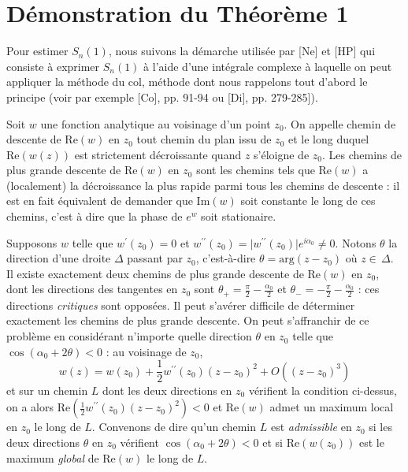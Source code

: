 \documentclass[12pt]{article}
\newcommand{\al}{\alpha}
\begin{document}

\section{D\'emonstration du Th\'eor\`eme 1}

Pour estimer $S_n(1)$, nous suivons
la d\'emarche utilis\'ee par [Ne] et [HP] qui consiste
\`a exprimer $S_n(1)$ \`a l'aide d'une
int\'egrale complexe \`a laquelle on peut appliquer la m\'ethode du col,
m\'ethode dont nous rappelons tout d'abord le principe
(voir par exemple [Co], pp. 91-94 ou [Di], pp. 279-285]).\\ \null

Soit $w$ une fonction analytique au voisinage d'un point $z_0$. On appelle
chemin de descente de $\text{Re}(w)$ en $z_0$ tout chemin
du plan issu de $z_0$ et le long duquel
$\text{Re}(w(z))$ est strictement d\'ecroissante quand $z$ s'\'eloigne de
$z_0$. Les chemins de plus grande descente de $\text{Re}(w)$ en $z_0$ sont
les chemins
tels que $\text{Re}(w)$ a (localement) la d\'ecroissance la plus rapide parmi
tous les chemins de descente : il est en fait \'equivalent
de demander que $\text{Im}(w)$ soit constante le long de
ces chemins, c'est \`a dire que la phase de $e^w$ soit stationaire.\\ \null

Supposons $w$ telle que
$w^{\prime}(z_0)=0$ et
$w^{\prime\prime}(z_0)=\vert w^{\prime\prime}(z_0) \vert e^{i\al_0}\not=0$.
Notons $\theta$ la direction d'une droite $\Delta$
passant par $z_0$, c'est-\`a-dire
$\theta=\text{arg}(z-z_0)$ o\`u $z\in\,\Delta$. Il existe exactement deux
chemins de
plus grande descente de $\text{Re}(w)$
en $z_0$, dont les directions des tangentes en $z_0$ sont
$\theta_+=\frac{\pi}{2}-\frac{\al_0}{2}$ et
$\theta_-=-\frac{\pi}{2}-\frac{\al_0}{2}$ : ces directions
\textit{critiques}
sont oppos\'ees. Il peut s'av\'erer difficile de d\'eterminer exactement
les chemins
de plus grande descente. On peut s'affranchir de ce probl\`eme
en consid\'erant n'importe quelle direction $\theta$ en $z_0$
telle que $\cos(\al_0+2\theta)<0$ : au voisinage de $z_0$,
$$
w(z)=w(z_0)+\frac{1}{2} w^{\prime\prime}(z_0) (z-z_0)^2+O((z-z_0)^3)
$$
et sur un chemin $L$ dont les deux directions en $z_0$ v\'erifient la
condition ci-dessus,
on a alors $\text{Re}(\frac{1}{2} w^{\prime\prime}(z_0)(z-z_0)^2)<0$
et $\text{Re}(w)$ admet un maximum local en $z_0$ le long de $L$.
Convenons de dire qu'un chemin $L$ est \textit{admissible} en $z_0$
si les deux directions
$\theta$ en $z_0$ v\'erifient $\cos(\al_0+2\theta)<0$
et si $\text{Re}(w(z_0))$ est le maximum \textit{global} de $\text{Re}(w)$
le long de $L$.\\
\end{document}
